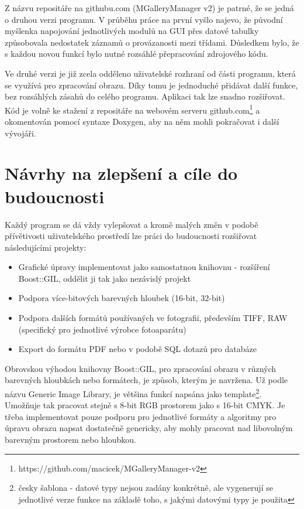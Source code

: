 \documentclass[11pt,twoside,a4paper]{book}
\begin{document}
\noindent
Z názvu repositáře na githubu.com (MGalleryManager v2) je patrné, že se jedná o druhou verzi programu. V průběhu práce na první vyšlo najevo, že původní myšlenka napojování jednotlivých modulů na GUI přes datové tabulky způsobovala nedostatek záznamů o provázanosti mezi třídami. Důsledkem bylo, že s každou novou funkcí bylo nutné rozsáhlé přepracování zdrojového kódu.

\indent
Ve druhé verzi je již zcela odděleno uživatelské rozhraní od části programu, která se využívá pro zpracování obrazu. Díky tomu je jednoduché přidávat další funkce, bez rozsáhlých zásahů do celého programu. Aplikaci tak lze snadno rozšiřovat. Kód je volně ke stažení z repositáře na webovém serveru github.com\footnote{https://github.com/macicek/MGalleryManager-v2} a okomentován pomocí syntaxe Doxygen, aby na něm mohli pokračovat i další vývojáři.

\section{Návrhy na zlepšení a cíle do budoucnosti}
\noindent
Každý program se dá vždy vylepšovat a kromě malých změn v podobě přívětivosti uživatelského prostředí lze práci do budoucnosti rozšiřovat následujícími projekty:
\begin{itemize}
\item Grafické úpravy implementovat jako samostatnou knihovnu - rozšíření Boost::GIL, oddělit ji tak jako nezávislý projekt
\item Podpora více-bitových barevných hloubek (16-bit, 32-bit)
\item Podpora dalších formátů používaných ve fotografii, především TIFF, RAW (specifický pro jednotlivé výrobce fotoaparátu)
\item Export do formátu PDF nebo v podobě SQL dotazů pro databáze
\end{itemize}

\indent
Obrovskou výhodou knihovny Boost::GIL, pro zpracování obrazu v různých barevných hloubkách nebo formátech, je způsob, kterým je navržena. Už podle názvu Generic Image Library, je většina funkcí napsána jako template\footnote{česky šablona - datové typy nejsou zadány konkrétně, ale vygenerují se jednotlivé verze funkce na základě toho, s jakými datovými typy je použita}. Umožňuje tak pracovat stejně s 8-bit RGB prostorem jako s 16-bit CMYK. Je třeba implementovat pouze podporu pro jednotlivé formáty a algoritmy pro úpravu obrazu napsat dostatečně genericky, aby mohly pracovat nad libovolným barevným prostorem nebo hloubkou.
\end{document}

